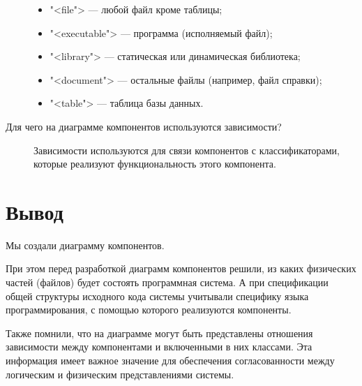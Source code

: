 \begin{description}
\begin{itemize}
			\item "<file"> --- любой файл кроме таблицы;
			\item "<executable"> --- программа (исполняемый файл);
			\item "<library"> --- статическая или динамическая библиотека;
			\item "<document"> --- остальные файлы (например, файл справки);
			\item "<table"> --- таблица базы данных.
		\end{itemize}
	\item [Для чего на диаграмме компонентов используются зависимости?]
		Зависимости используются для связи компонентов с классификаторами,
		которые реализуют функциональность этого компонента.
\end{description}

\clearpage

\section*{\LARGE Вывод}
Мы создали диаграмму компонентов.\par
При этом перед разработкой диаграмм компонентов решили, из каких
физических частей (файлов) будет состоять программная система.
А при спецификации общей структуры исходного кода системы
учитывали специфику языка программирования, с помощью
которого реализуются компоненты.\par
Также помнили, что на диаграмме могут быть представлены отношения
зависимости между компонентами и включенными в них классами.
Эта информация имеет важное значение для обеспечения согласованности
между логическим и физическим представлениями системы.

